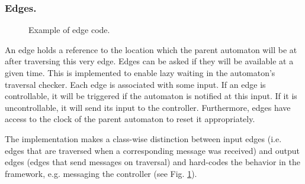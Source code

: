\subsubsection{Edges.}
\label{subsubsec:edges}

\begin{figure}[t]

\caption{Example of edge code.}
\label{edge-example}
\end{figure}

An edge holds a reference to the location which the parent automaton
will be at after traversing this very edge. Edges can be asked if
they will be available at a given time. This is implemented to enable
lazy waiting in the automaton's traversal checker. Each edge is associated
with some input. If an edge is controllable, it will be triggered
if the automaton is notified at this input. If it is uncontrollable,
it will send its input to the controller. Furthermore, edges have
access to the clock of the parent automaton to reset it appropriately.

The implementation makes a class-wise distinction between input edges
(i.e. edges that are traversed when a corresponding message was received) and
output edges (edges that send messages on traversal) and hard-codes the behavior
in the framework, e.g. messaging the controller (see Fig. \ref{edge-example}).
